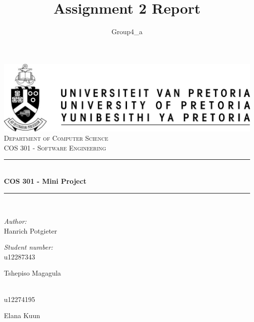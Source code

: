 \documentclass[a4paper,12pt]{report}
\author{Group4_a}
\title{ Assignment 2 Report}
\newcommand{\HRule}{\rule{\linewidth}{0.5mm}}
\begin{document}
\setlength{\parskip}{6pt}

\begin{titlepage}

\begin{center}
\includegraphics[width=1\textwidth]{./up-logo.jpg}\\[0.4cm]    
\textsc{\LARGE Department of Computer Science}\\[1.5cm]
\textsc{\Large COS 301 - Software Engineering}\\[0.5cm]
\HRule \\[0.4cm]
{ \huge \bfseries COS 301 - Mini Project}\\[0.4cm]
\HRule \\[0.4cm]
\begin{minipage}{0.4\textwidth}
\begin{flushleft} \large
\emph{Author:}\\
Hanrich {Potgieter}
\end{flushleft}
\end{minipage}
\begin{minipage}{0.4\textwidth}
\begin{flushright} \large
\emph{Student number:} \\
u12287343
\end{flushright}
\end{minipage}
\begin{minipage}{0.4\textwidth}
\begin{flushleft} \large
Tshepiso {Magagula}
\end{flushleft}
\end{minipage}
\begin{minipage}{0.4\textwidth}
\begin{flushright} \large
\emph{} \\
u12274195
\end{flushright}
\end{minipage}
\begin{minipage}{0.4\textwidth}
\begin{flushleft} \large
Elana {Kuun}
\end{flushleft}

\end{minipage}
\end{center}
\end{titlepage}
\end{document}
